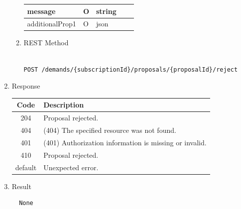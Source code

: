 \begin{enumerate}
\begin{enumerate}
\begin{table}[H]
\begin{center}
\begin{tabular}{|p{3cm}|l|p{3cm}|p{3cm}|p{4cm}|}
\hline	

message				& O &	string 			&		& 		\\

\hline

additionalProp1 	& O &	json			&		& 		\\

\hline

\end{tabular}
\end{center}

\end{table}

\item REST Method

\begin{tcolorbox}[boxrule=0pt, frame empty]
\begin{verbatim} 

POST /demands/{subscriptionId}/proposals/{proposalId}/reject

\end{verbatim}
\end{tcolorbox}

\end{enumerate}

\item Response

\begin{table}[H]
\footnotesize

\begin{center}
\begin{tabular}{|c|l|} 
\hline
\rowcolor{lightgray}	Code 		& 	Description \\
\hline
204	 		&	Proposal rejected.  \\
\hline
404			&	(404) The specified resource was not found. \\
\hline
401			&	(401) Authorization information is missing or invalid. \\
\hline
410			&	Proposal rejected. \\
\hline
default		&	Unexpected error. \\
\hline
\end{tabular}
\end{center}

\end{table}

\item Result

\begin{tcolorbox}[boxrule=0pt, frame empty]
\begin{verbatim}
  None
\end{verbatim}
\end{tcolorbox}


\end{enumerate}
